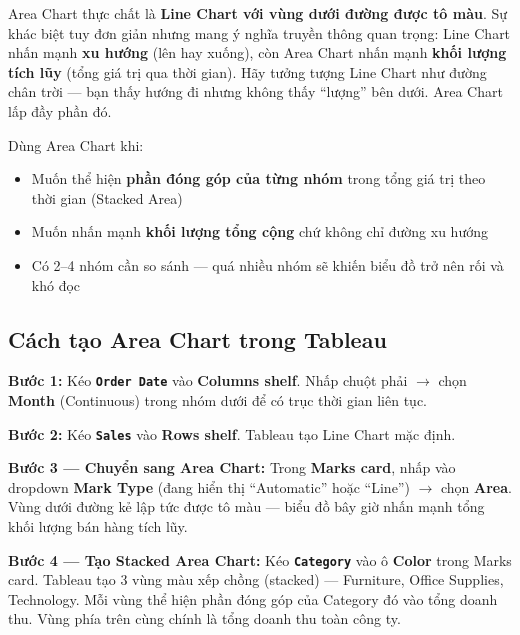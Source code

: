 \documentclass[12pt]{article}
\begin{document}
\noindent Area Chart thực chất là \textbf{Line Chart với vùng dưới đường được tô màu}. Sự khác biệt tuy đơn giản nhưng mang ý nghĩa truyền thông quan trọng: Line Chart nhấn mạnh \textbf{xu hướng} (lên hay xuống), còn Area Chart nhấn mạnh \textbf{khối lượng tích lũy} (tổng giá trị qua thời gian). Hãy tưởng tượng Line Chart như đường chân trời --- bạn thấy hướng đi nhưng không thấy ``lượng'' bên dưới. Area Chart lấp đầy phần đó.

\noindent Dùng Area Chart khi:
\begin{itemize}[nosep]
    \item Muốn thể hiện \textbf{phần đóng góp của từng nhóm} trong tổng giá trị theo thời gian (Stacked Area)
    \item Muốn nhấn mạnh \textbf{khối lượng tổng cộng} chứ không chỉ đường xu hướng
    \item Có 2--4 nhóm cần so sánh --- quá nhiều nhóm sẽ khiến biểu đồ trở nên rối và khó đọc
\end{itemize}

\subsection{Cách tạo Area Chart trong Tableau}

\noindent \textbf{Bước 1:} Kéo \textbf{\texttt{Order Date}} vào \textbf{Columns shelf}. Nhấp chuột phải $\rightarrow$ chọn \textbf{Month} (Continuous) trong nhóm dưới để có trục thời gian liên tục.

\noindent \textbf{Bước 2:} Kéo \textbf{\texttt{Sales}} vào \textbf{Rows shelf}. Tableau tạo Line Chart mặc định.

\noindent \textbf{Bước 3 --- Chuyển sang Area Chart:} Trong \textbf{Marks card}, nhấp vào dropdown \textbf{Mark Type} (đang hiển thị ``Automatic'' hoặc ``Line'') $\rightarrow$ chọn \textbf{Area}. Vùng dưới đường kẻ lập tức được tô màu --- biểu đồ bây giờ nhấn mạnh tổng khối lượng bán hàng tích lũy.

\noindent \textbf{Bước 4 --- Tạo Stacked Area Chart:} Kéo \textbf{\texttt{Category}} vào ô \textbf{Color} trong Marks card. Tableau tạo 3 vùng màu xếp chồng (stacked) --- Furniture, Office Supplies, Technology. Mỗi vùng thể hiện phần đóng góp của Category đó vào tổng doanh thu. Vùng phía trên cùng chính là tổng doanh thu toàn công ty.
\end{document}

